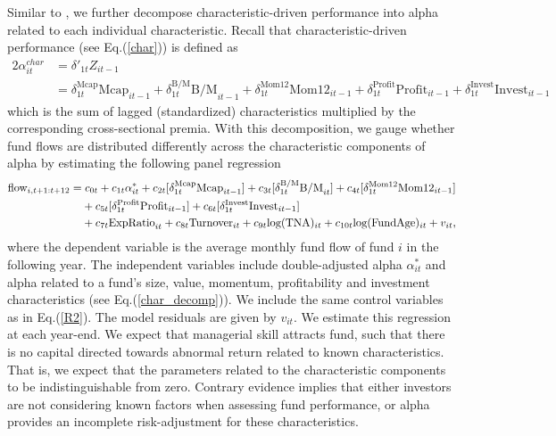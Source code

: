 \par Similar to \citet{barber2016factors}, we further decompose characteristic-driven performance into alpha related to each individual characteristic. Recall that characteristic-driven performance (see Eq.(\ref{char})) is defined as
\begin{alignat}{2}
\label{char_decomp}
 \alpha^{char}_{it} &= \delta'_{1t}Z_{it-1} \nonumber \\ 
 &= \delta^{\text{Mcap}}_{1t}\text{Mcap}_{it-1}  + \delta^{\text{B/M}}_{1t}\text{B/M}_{it-1} +  \delta^{\text{Mom12}}_{1t}\text{Mom12}_{it-1} + \delta^{\text{Profit}}_{1t}\text{Profit}_{it-1} + 
 \delta^{\text{Invest}}_{1t}\text{Invest}_{it-1} 
\end{alignat}
which is the sum of lagged (standardized) characteristics multiplied by the corresponding cross-sectional premia. With this decomposition, we gauge whether fund flows are distributed differently across the characteristic components of alpha by estimating the following panel regression 
\begin{alignat}{2}
    \label{decomp}
       \text{flow}_{i,t+1:t+12} = & \hspace{0.1cm} c_{0t} + c_{1t} \alpha^*_{it} + c_{2t} [\delta^{\text{Mcap}}_{1t}\text{Mcap}_{it-1}]  + c_{3t} [\delta^{\text{B/M}}_{1t}\text{B/M}_{it}] +  c_{4t}[\delta^{\text{Mom12}}_{1t}\text{Mom12}_{it-1}] \nonumber \\
        &+ c_{5t}[\delta^{\text{Profit}}_{1t}\text{Profit}_{it-1}] + 
 c_{6t}[\delta^{\text{Invest}}_{1t}\text{Invest}_{it-1}]  \nonumber \\ 
 &+ c_{7t}\text{ExpRatio}_{it} + c_{8t}\text{Turnover}_{it} + c_{9t}\text{log}(\text{TNA})_{it} + c_{10t}\text{log}(\text{FundAge})_{it} + v_{it},
\end{alignat}
where the dependent variable is the average monthly fund flow of fund $i$ in the following year. The independent variables include double-adjusted alpha $\alpha^*_{it}$ and alpha related to a fund's size, value, momentum, profitability and investment characteristics (see Eq.(\ref{char_decomp})). We include the same control variables as in Eq.(\ref{R2}). The model residuals are given by $v_{it}$. We estimate this regression at each year-end. We expect that managerial skill attracts fund, such that there is no capital directed towards abnormal return related to known characteristics. That is, we expect that the parameters related to the characteristic components to be indistinguishable from zero. Contrary evidence implies that either investors are not considering known factors when assessing fund performance, or alpha provides an incomplete risk-adjustment for these characteristics.

